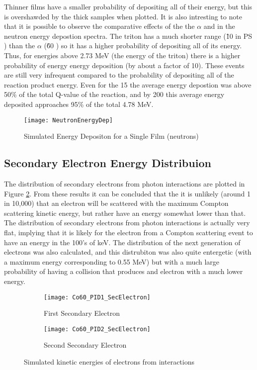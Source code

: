 Thinner films have a smaller probability of depositing all of their energy, but this is overshawded by the thick samples when plotted.
It is also intresting to note that it is possible to observe the comparative effects of the the $\alpha$ and  in the neutron energy depostion spectra. 
The triton has a much shorter range (\~ 10 \micron in PS \cite{kudo_recoil_1980}) than the $\alpha$ (\~ 60 \micron) so it has a higher probability of depositing all of its energy.
Thus, for energies above 2.73 MeV (the energy of the triton) there is a higher probability of energy energy deposition (by about a factor of 10). These events are still very infrequent compared to the probability of depositing all of the reaction product energy.
Even for the 15 \micron the average energy depostion was above 50\% of the total Q-value of the reaction, and by 200 \micron this average energy deposited approaches 95\% of the total 4.78 MeV.
\begin{figure}[h]
    \texttt{[image: NeutronEnergyDep]}
	\caption{Simulated Energy Depositon for a Single Film (neutrons)}
    \label{fig:SimEDepNeutron}
\end{figure}

\subsection{Secondary Electron Energy Distribuion}

The distribution of secondary electrons from photon interactions are plotted in Figure \ref{fig:SecElecKinEDist}.
From these results it can be concluded that the it is unlikely (around 1 in 10,000) that an electron will be scattered with the maximum Compton scattering kinetic energy, but rather have an energy somewhat lower than that.
The distribution of secondary electrons from photon interactions is actually very flat, implying that it is likely for the electron from a Compton scattering event to have an energy in the 100's of keV.
The distribution of the next generation of electrons was also calculated, and this distrubiton was also quite entergetic (with a maximum energy corresponding to 0.55 MeV) but with a much large probability of having a collision that produces and electron with a much lower energy.
\begin{figure}[h]
    \centering
    \begin{subfigure}[b]{0.45\figurewidth}
        \texttt{[image: Co60\_PID1\_SecElectron]}
        \caption{First Secondary Electron}
    \end{subfigure}
    \begin{subfigure}[b]{0.45\figurewidth}
        \texttt{[image: Co60\_PID2\_SecElectron]}
        \caption{Second Secondary Electron}
    \end{subfigure}
    \caption{Simulated kinetic energies of electrons from  interactions}
    \label{fig:SecElecKinEDist}
\end{figure}
